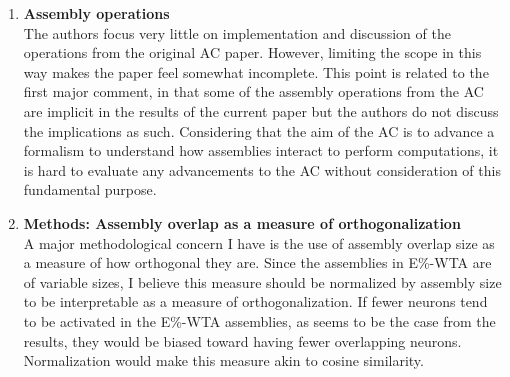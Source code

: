 \documentclass[a4paper, 11pt]{article}
\begin{document}
\begin{enumerate}
\begin{itemize}
        \item \textbf{General commentary on assembly-based computations} -- The three points above also interact with each other: How large an assembly is influences how well it can be recovered by restimulation, as well as how many orthogonal assemblies can exist in a population of fixed size. An overarching view of these facets of computation is missing in the discussion.
        
        \item \textbf{Balance of the results section} -- There is perhaps more space than necessary devoted to the first section of the results, which addresses the conditions under which assemblies form. This is of course an important aspect for reproducibility and relevant for parameter selection, but some of these details may be better relegated to supplementals. The remainder of the results have greater scientific interpretations and are likely of more interest to the general scientific audience.
    \end{itemize}

    \item \textbf{Assembly operations}\\
    The authors focus very little on implementation and discussion of the operations from the original AC paper. However, limiting the scope in this way makes the paper feel somewhat incomplete. This point is related to the first major comment, in that some of the assembly operations from the AC are implicit in the results of the current paper but the authors do not discuss the implications as such. Considering that the aim of the AC is to advance a formalism to understand how assemblies interact to perform computations, it is hard to evaluate any advancements to the AC without consideration of this fundamental purpose.

    \item \textbf{Methods: Assembly overlap as a measure of orthogonalization}\\
    A major methodological concern I have is the use of assembly overlap size as a measure of how orthogonal they are. Since the assemblies in E\%-WTA are of variable sizes, I believe this measure should be normalized by assembly size to be interpretable as a measure of orthogonalization. If fewer neurons tend to be activated in the E\%-WTA assemblies, as seems to be the case from the results, they would be biased toward having fewer overlapping neurons. Normalization would make this measure akin to cosine similarity.
\end{enumerate}
\end{document}
